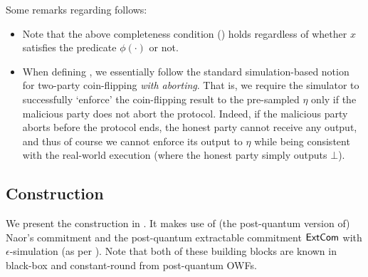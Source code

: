 Some remarks regarding  follows:
\begin{itemize}
\item
Note that the above completeness condition () holds regardless of whether $x$ satisfies the predicate $\phi(\cdot)$ or not.

\item
When defining , we essentially follow the standard simulation-based notion for two-party coin-flipping {\em with aborting}. That is, we require the simulator to successfully `enforce' the coin-flipping result to the pre-sampled $\eta$ only if the malicious party does not abort the protocol. Indeed, if the malicious party aborts before the protocol ends, the honest party cannot receive any output, and thus of course we cannot enforce its output to $\eta$ while being consistent with the real-world execution (where the honest party simply outputs $\bot$).  
\end{itemize}

\subsection{Construction}
\label{sec:com-n-prove:constr}

We present the construction in . It makes use of (the post-quantum version of) Naor's commitment and the post-quantum extractable commitment $\mathsf{ExtCom}$ with $\epsilon$-simulation (as per ). Note that both of these building blocks are known in black-box and constant-round from post-quantum OWFs.


